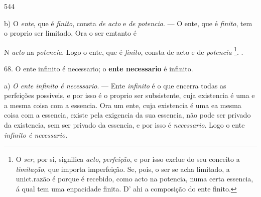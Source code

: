  544

b) O \emph{ente}, que é \emph{finito}, consta \emph{de acto} e \emph{de potencia}. --- O ente, que é \emph{finito}, tem o proprio ser limitado, Ora o ser emtanto é 

N  \emph{acto} na \emph{potencia}. Logo o ente, que é \emph{finito}, consta de acto e de \emph{potencia} \footnote{O \emph{ser}, por si, signilica \emph{acto}, \emph{perfeição}, e por isso exclue do seu conceito a \emph{limitação}, que importa imperfeição. Se, pois, o ser se acha limitado, a unict.razão é porque é recebido, como acto na potencia, numa certa essencia, á qual tem uma enpacidade finita. D' ahi a composição do ente finito.}. .

68. O ente infinito é necessario; o \textbf{ente necessario} é infinito.

a) \emph{O ente infinito é necessario}. --- Ente \emph{infinito} é o que encerra todas as perfeições possiveis, e por isso é o proprio ser subsistente, cuja existencia é uma e a mesma coisa com a essencia. Ora um ente, cuja existencia é uma ea mesma coisa com a essencia, existe pela exigencia da sua essencia, não pode ser privado da existencia, sem ser privado da essencia, e por isso é \emph{necessario}. Logo o ente \emph{infinito é necessario}.

